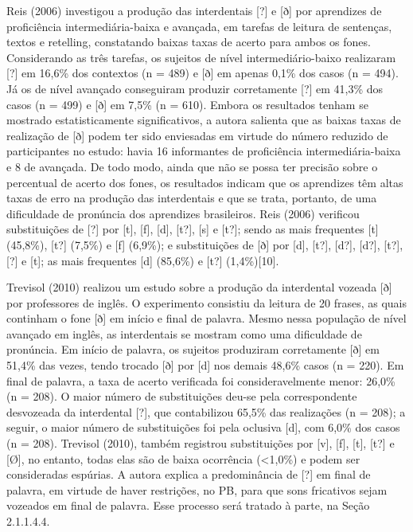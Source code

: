 Reis (2006) investigou a produ\c{c}\~ao das interdentais {[}?{]} e {[}ð{]} por
aprendizes de profici\^encia intermedi\'aria-baixa e avan\c{c}ada, em tarefas de
leitura de senten\c{c}as, textos e retelling, constatando baixas taxas de
acerto para ambos os fones. Considerando as tr\^es tarefas, os sujeitos de
n\'ivel intermedi\'ario-baixo realizaram {[}?{]} em 16,6\% dos contextos (n
= 489) e {[}ð{]} em apenas 0,1\% dos casos (n = 494). J\'a os de n\'ivel
avan\c{c}ado conseguiram produzir corretamente {[}?{]} em 41,3\% dos casos
(n = 499) e {[}ð{]} em 7,5\% (n = 610). Embora os resultados tenham se
mostrado estatisticamente significativos, a autora salienta que as
baixas taxas de realiza\c{c}\~ao de {[}ð{]} podem ter sido enviesadas em
virtude do n\'umero reduzido de participantes no estudo: havia 16
informantes de profici\^encia intermedi\'aria-baixa e 8 de avan\c{c}ada. De todo
modo, ainda que n\~ao se possa ter precis\~ao sobre o percentual de acerto
dos fones, os resultados indicam que os aprendizes t\^em altas taxas de
erro na produ\c{c}\~ao das interdentais e que se trata, portanto, de uma
dificuldade de pron\'uncia dos aprendizes brasileiros. Reis (2006)
verificou substitui\c{c}\~oes de {[}?{]} por {[}t{]}, {[}f{]}, {[}d{]},
{[}t?{]}, {[}s{]} e {[}t?{]}; sendo as mais frequentes {[}t{]} (45,8\%),
{[}t?{]} (7,5\%) e {[}f{]} (6,9\%); e substitui\c{c}\~oes de {[}ð{]} por
{[}d{]}, {[}t?{]}, {[}d?{]}, {[}d?{]}, {[}t?{]}, {[}?{]} e {[}t{]}; as
mais frequentes {[}d{]} (85,6\%) e {[}t?{]} (1,4\%){[}10{]}.

Trevisol (2010) realizou um estudo sobre a produ\c{c}\~ao da interdental
vozeada {[}ð{]} por professores de ingl\^es. O experimento consistiu da
leitura de 20 frases, as quais continham o fone {[}ð{]} em in\'icio e
final de palavra. Mesmo nessa popula\c{c}\~ao de n\'ivel avan\c{c}ado em ingl\^es, as
interdentais se mostram como uma dificuldade de pron\'uncia. Em in\'icio de
palavra, os sujeitos produziram corretamente {[}ð{]} em 51,4\% das
vezes, tendo trocado {[}ð{]} por {[}d{]} nos demais 48,6\% casos (n =
220). Em final de palavra, a taxa de acerto verificada foi
consideravelmente menor: 26,0\% (n = 208). O maior n\'umero de
substitui\c{c}\~oes deu-se pela correspondente desvozeada da interdental
{[}?{]}, que contabilizou 65,5\% das realiza\c{c}\~oes (n = 208); a seguir, o
maior n\'umero de substitui\c{c}\~oes foi pela oclusiva {[}d{]}, com 6,0\% dos
casos (n = 208). Trevisol (2010), tamb\'em registrou substitui\c{c}\~oes por
{[}v{]}, {[}f{]}, {[}t{]}, {[}t?{]} e {[}Ø{]}, no entanto, todas elas
s\~ao de baixa ocorr\^encia (\textless{}1,0\%) e podem ser consideradas
esp\'urias. A autora explica a predomin\^ancia de {[}?{]} em final de
palavra, em virtude de haver restri\c{c}\~oes, no PB, para que sons fricativos
sejam vozeados em final de palavra. Esse processo ser\'a tratado à parte,
na Se\c{c}\~ao 2.1.1.4.4.

